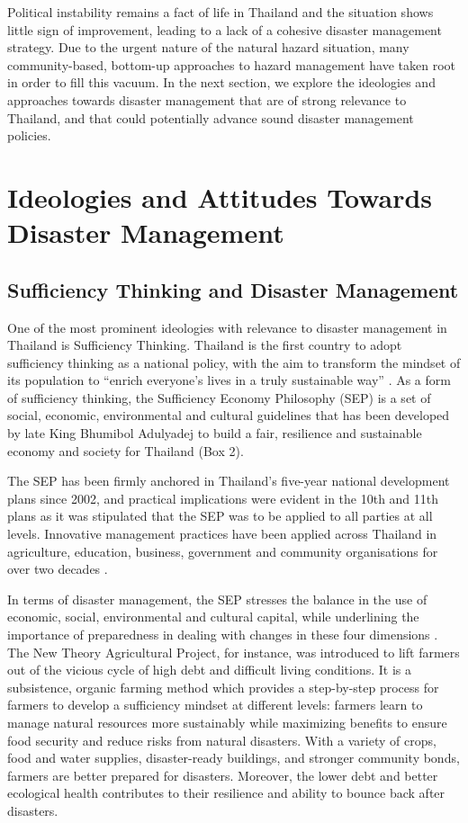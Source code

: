 Political instability remains a fact of life in Thailand and the situation shows little sign of improvement, leading to a lack of a cohesive disaster management strategy. Due to the urgent nature of the natural hazard situation, many community-based, bottom-up approaches to hazard management have taken root in order to fill this vacuum. In the next section, we explore the ideologies and approaches towards disaster management that are of strong relevance to Thailand, and that could potentially advance sound disaster management policies.

\section{Ideologies and Attitudes Towards Disaster Management}

\subsection{Sufficiency Thinking and Disaster Management} 

One of the most prominent ideologies with relevance to disaster management in Thailand is Sufficiency Thinking. Thailand is the first country to adopt sufficiency thinking as a national policy, with the aim to transform the mindset of its population to ``enrich everyone's lives in a truly sustainable way'' \citep{avery2016sufficiency}. As a form of sufficiency thinking, the Sufficiency Economy Philosophy (SEP) is a set of social, economic, environmental and cultural guidelines that has been developed by late King Bhumibol Adulyadej to build a fair, resilience and sustainable economy and society for Thailand (Box 2).


The SEP has been firmly anchored in Thailand's five-year national development plans since 2002, and practical implications were evident in the 10th and 11th plans as it was stipulated that the SEP was to be applied to all parties at all levels. Innovative management practices have been applied across Thailand in agriculture, education, business, government and community organisations for over two decades \citep{avery2016sufficiency}. 

In terms of disaster management, the SEP stresses the balance in the use of economic, social, environmental and cultural capital, while underlining the importance of preparedness in dealing with changes in these four dimensions \citep{avery2016sufficiency}. The New Theory Agricultural Project, for instance, was introduced to lift farmers out of the vicious cycle of high debt and difficult living conditions. It is a subsistence, organic farming method which provides a step-by-step process for farmers to develop a sufficiency mindset at different levels: farmers learn to manage natural resources more sustainably while maximizing benefits to ensure food security and reduce risks from natural disasters. With a variety of crops, food and water supplies, disaster-ready buildings, and stronger community bonds, farmers are better prepared for disasters. Moreover, the lower debt and better ecological health contributes to their resilience and ability to bounce back after disasters. 

